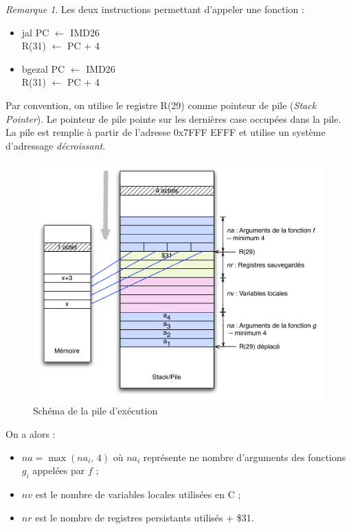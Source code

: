 \documentclass[11pt,english,french]{scrreprt}
\theoremstyle{remark}
\newtheorem*{rem*}{Remarque}
\theoremstyle{definition}
\begin{document}
\begin{rem*}
	Les deux instructions permettant d'appeler une fonction :\begin{itemize}
		\item jal PC $\leftarrow$ IMD26\\
		R(31) $\leftarrow$ PC + 4
		\item bgezal PC $\leftarrow$ IMD26\\
		R(31) $\leftarrow$ PC + 4
	\end{itemize}
\end{rem*}

Par convention, on utilise le registre R(29) comme pointeur de pile (\emph{Stack Pointer}). Le pointeur de pile pointe sur les dernières case occupées dans la pile.\\
La pile est remplie à partir de l'adresse 0x7FFF EFFF et utilise un système d'adressage \emph{décroissant}.

\begin{figure}[!h]
	\vspace{-10pt}
	\center
	\includegraphics[scale=.48]{diagrammes/Stack}
	\vspace{-10pt}
	\caption{Schéma de la pile d'exécution}
	\vspace{-20pt}
\end{figure}

\vspace{20pt}

On a alors :\begin{itemize}
	\item $na=\max(na_i,\,4)$ où $na_i$ représente ne nombre d'arguments des fonctions $g_i$ appelées par $f$ ;
	\item $nv$ est le nombre de variables locales utilisées en C ;
	\item $nr$ est le nombre de registres persistants utilisés $+$ \$31.
\end{itemize}
\end{document}

